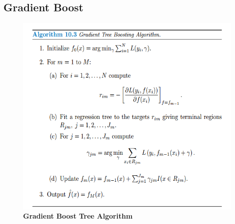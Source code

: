 \documentclass[11pt]{article}
\begin{document}
\subsection{Gradient Boost}
\begin{figure}
\begin{minipage}[t]{1\linewidth}
  \centering
  \centerline{\includegraphics[scale = 0.5]{grad_boost.png}}
\end{minipage}
\caption{\footnotesize{\textbf{Gradient Boost Tree Algorithm \citep{hastie2009elements}}}}
\label{fig: grad_boost}
\end{figure}
\end{document}
